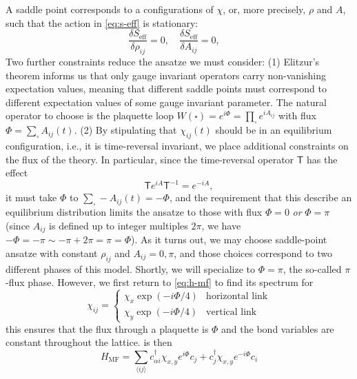 \documentclass{report}
\begin{document}
A saddle point corresponds to a configurations of $ \chi $, or, more
precisely, $ \rho $ and $ A $, such that the action in \cref{eq:s-eff} is 
stationary:
\begin{equation*}
	\frac{\delta S_{\text{eff}}}{\delta \rho_{ij}} = 0 ,\quad 
	\frac{\delta S_{\text{eff}}}{\delta A_{ij}} = 0 ,\quad 
\end{equation*}
Two further constraints reduce the ansatze we must consider: (1) Elitzur's
theorem informs us that only gauge invariant operators carry non-vanishing
expectation values, meaning that different saddle points must correspond to 
different expectation values of some gauge invariant parameter. The natural 
operator to choose is the plaquette loop $ W(\square) = e^{i\Phi} = \prod_\square 
e^{iA_{ij}}$ with flux $ \Phi = \sum_\square A_{ij}(t)$. (2) By stipulating that 
$ \chi_{ij}(t) $ should be in an equilibrium configuration, i.e., it is
time-reversal invariant, we place additional constraints on the flux of the theory. 
In particular, since the time-reversal operator $ \mathsf{T} $ has the effect 
\begin{equation*}
	\mathsf{T} e^{iA} \mathsf{T}^{-1} 
		= e^{-iA},
\end{equation*}
it must take $ \Phi $ to $ \sum_\square - A_{ij}(t) = -\Phi $, and the requirement 
that this describe an equilibrium distribution limits the ansatze to those 
with flux $ \Phi = 0 $ \textit{or} $ \Phi = \pi $ (since $ A_{ij} $ is defined up 
to integer multiples $ 2\pi $, we have $- \Phi = -\pi \sim -\pi + 2\pi = \pi =
\Phi$). As it turns out, we may choose saddle-point ansatze with constant $
\rho_{ij} $ and $ A_{ij} = 0,\pi $, and those choices correspond to two
different phases of this model. Shortly, we will specialize to $ \Phi = \pi $,
the so-called $ \pi $-flux phase. However, we first return to \cref{eq:h-mf} to
find its spectrum for
\begin{equation*}
	\chi_{ij} = \begin{cases}
		\chi_x \exp(-i\Phi/4) & \text{horizontal link}\\
		\chi_y \exp(-i\Phi/4) & \text{vertical link}
	\end{cases}
\end{equation*}
this ensures that the flux through a plaquette is $ \Phi $ and the bond variables 
are constant throughout the lattice.  is then 
\begin{equation*}
	H_{\text{MF}} = \sum_{\langle ij\rangle}
	c_{\alpha i}^\dagger \chi_{x,y} e^{i\Phi} c_j + c_j^\dagger \chi_{x,y}e^{-i\Phi} c_i
\end{equation*}
\end{document}
